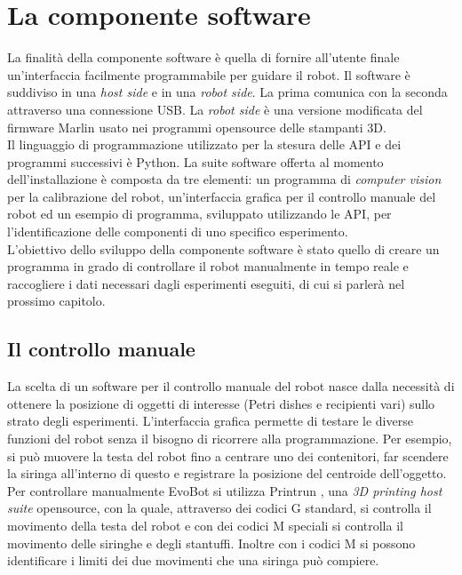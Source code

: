 \section{La componente software}
\label{sec:123}
La finalità della componente software è quella di fornire all'utente finale un'interfaccia facilmente programmabile per guidare il robot. Il software è suddiviso in una \emph{host side} e in una \emph{robot side}. La prima comunica con la seconda attraverso una connessione USB. La \emph{robot side} è una versione modificata del firmware Marlin usato nei programmi opensource delle stampanti 3D. 
\\Il linguaggio di programmazione utilizzato per la stesura delle API e dei programmi successivi è Python. La suite software offerta al momento dell'installazione è composta da tre elementi:
un programma di \emph{computer vision} per la calibrazione del robot, un'interfaccia grafica per il controllo manuale del robot ed un esempio di programma, sviluppato utilizzando le API, per l'identificazione delle componenti di uno specifico esperimento.
\\L'obiettivo dello sviluppo della componente software è stato quello di creare un programma in grado di controllare il robot manualmente in tempo reale e raccogliere i dati necessari dagli esperimenti eseguiti, di cui si parlerà nel prossimo capitolo. 

\subsection{Il controllo manuale}
\label{sec:00123}
La scelta di un software per il controllo manuale del robot nasce dalla necessità di ottenere la posizione di oggetti di interesse (Petri dishes e recipienti vari) sullo strato degli esperimenti. L'interfaccia grafica permette di testare le diverse funzioni del robot senza il bisogno di ricorrere alla programmazione. Per esempio, si può muovere la testa del robot fino a centrare uno dei contenitori, far scendere la siringa all'interno di questo e registrare la posizione del centroide dell'oggetto. 
\\Per controllare manualmente EvoBot si utilizza Printrun \cite{printrun}, una \emph{3D printing host suite}  opensource, con la quale, attraverso dei codici G standard, si controlla il movimento della testa del robot e con dei codici M speciali si controlla il movimento delle siringhe e degli stantuffi. Inoltre con i codici M si possono identificare i limiti dei due movimenti che una siringa può compiere.

